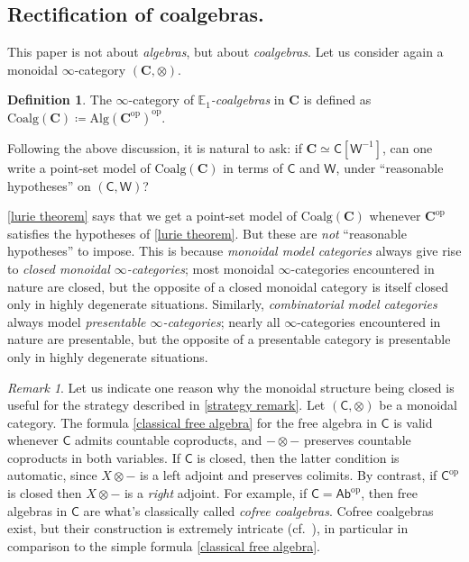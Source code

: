 \documentclass[a4paper,12pt]{amsart}
\theoremstyle{plain}
\theoremstyle{definition}
\newtheorem{definition}[theorem]{Definition}%
\theoremstyle{remark}
\newtheorem{remark}[theorem]{\sc Remark}%
\begin{document}
\subsection{Rectification of coalgebras.} This paper is not about \emph{algebras}, but about \emph{coalgebras}. 
Let us consider again a monoidal $\infty$-category $(\mathbf C,\otimes)$. 

\begin{definition}\label{def:coalgebra}The $\infty$-category of \emph{$\mathbb E_1$-coalgebras} in $\mathbf{C}$ is defined as $\mathrm{Coalg}(\mathbf C) \coloneqq \mathrm{Alg}(\mathbf C^{\mathrm{op}})^{\mathrm{op}}$.
\end{definition} 

Following the above discussion, it is natural to ask: if $\mathbf C \simeq \mathsf C[\mathsf W^{-1}]$, can one write a point-set model of $\mathrm{Coalg}(\mathbf C)$ in terms of $\mathsf C$ and $\mathsf W$, under ``reasonable hypotheses''  on $(\mathsf C,\mathsf W)$? 

\cref{lurie theorem} says that we get a point-set model of $\mathrm{Coalg}(\mathbf C)$ whenever $\mathbf C^{\mathrm{op}}$ satisfies the hypotheses of \cref{lurie theorem}. But these are \emph{not} ``reasonable hypotheses'' to impose. This is because \emph{monoidal model categories} always give rise to \emph{closed monoidal $\infty$-categories}; most monoidal $\infty$-categories encountered in nature are closed, but the opposite of a closed monoidal category is  itself closed only in highly degenerate situations.  Similarly, \emph{combinatorial model categories} always model \emph{presentable $\infty$-categories}; nearly all  $\infty$-categories encountered in nature are presentable, but the opposite of a presentable category is  presentable only in highly degenerate situations.



\begin{remark}\label{cofree are complicated}Let us indicate one reason why the monoidal structure being closed is useful for the strategy described in \cref{strategy remark}. Let $(\mathsf C,\otimes)$ be a monoidal category. The formula \eqref{classical free algebra} for the free algebra in $\mathsf C$ is valid whenever $\mathsf C$ admits countable coproducts, and $-\otimes-$ preserves countable coproducts in both variables. If $\mathsf C$ is closed, then the latter condition is automatic, since $X \otimes -$ is a left adjoint and preserves colimits. By contrast, if $\mathsf C^{\mathrm{op}}$ is closed then $X \otimes -$ is a \emph{right} adjoint. For example, if $\mathsf C = \mathsf{Ab}^{\mathrm{op}}$, then free algebras in $\mathsf C$ are what's classically called \emph{cofree coalgebras}. Cofree coalgebras exist, but their construction is extremely intricate (cf.~\cite{fox,Hazewinkel03}), in particular in comparison to the simple formula \eqref{classical free algebra}.

\end{remark}
\end{document}
